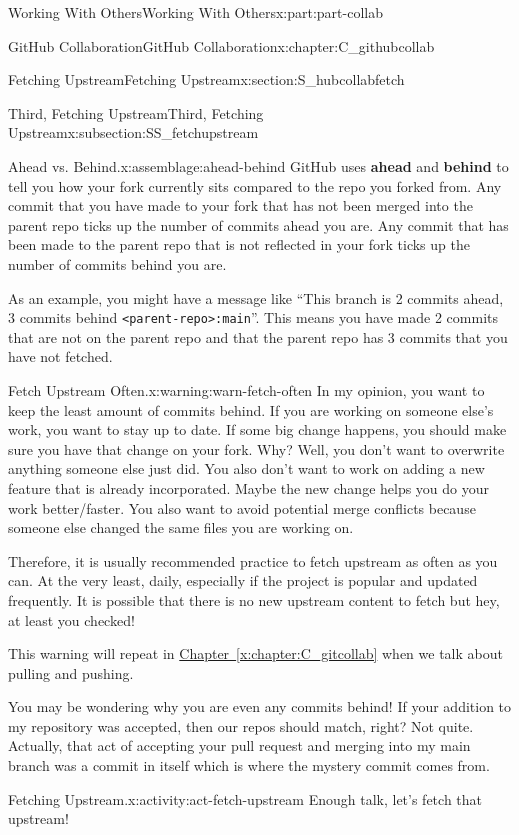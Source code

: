 \documentclass[oneside,10pt,]{book}
\newcommand{\xreffont}{\relax}
\newcommand{\mono}[1]{\texttt{#1}}
\newcommand{\terminology}[1]{\textbf{#1}}
\begin{document}
\begin{partptx}{Working With Others}{}{Working With Others}{}{}{x:part:part-collab}
\begin{chapterptx}{GitHub Collaboration}{}{GitHub Collaboration}{}{}{x:chapter:C_githubcollab}
\begin{sectionptx}{Fetching Upstream}{}{Fetching Upstream}{}{}{x:section:S_hubcollabfetch}
\begin{subsectionptx}{Third, Fetching Upstream}{}{Third, Fetching Upstream}{}{}{x:subsection:SS_fetchupstream}
\begin{assemblage}{Ahead vs. Behind.}{x:assemblage:ahead-behind}%
GitHub uses \terminology{ahead} and \terminology{behind} to tell you how your fork currently sits compared to the repo you forked from. Any commit that you have made to your fork that has not been merged into the parent repo ticks up the number of commits ahead you are. Any commit that has been made to the parent repo that is not reflected in your fork ticks up the number of commits behind you are.%
\par
As an example, you might have a message like ``This branch is 2 commits ahead, 3 commits behind \mono{<parent-repo>:main}''. This means you have made 2 commits that are not on the parent repo and that the parent repo has 3 commits that you have not fetched.%
\end{assemblage}
\begin{warning}{Fetch Upstream Often.}{x:warning:warn-fetch-often}%
In my opinion, you want to keep the least amount of commits behind. If you are working on someone else's work, you want to stay up to date. If some big change happens, you should make sure you have that change on your fork. Why? Well, you don't want to overwrite anything someone else just did. You also don't want to work on adding a new feature that is already incorporated. Maybe the new change helps you do your work better\slash{}faster. You also want to avoid potential merge conflicts because someone else changed the same files you are working on.%
\par
Therefore, it is usually recommended practice to fetch upstream as often as you can. At the very least, daily, especially if the project is popular and updated frequently. It is possible that there is no new upstream content to fetch but hey, at least you checked!%
\par
This warning will repeat in \hyperref[x:chapter:C_gitcollab]{Chapter~{\xreffont\ref{x:chapter:C_gitcollab}}} when we talk about pulling and pushing.%
\end{warning}
You may be wondering why you are even any commits behind! If your addition to my repository was accepted, then our repos should match, right? Not quite. Actually, that act of accepting your pull request and merging into my main branch was a commit in itself which is where the mystery commit comes from.%
\begin{activity}{Fetching Upstream.}{x:activity:act-fetch-upstream}%
Enough talk, let's fetch that upstream!%
\begin{enumerate}[font=\bfseries,label=(\alph*),ref=\alph*]

\end{enumerate}
\end{activity}
\end{subsectionptx}
\end{sectionptx}
\end{chapterptx}
\end{partptx}
\end{document}
